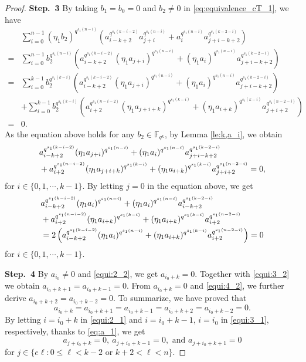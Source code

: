 \documentclass{amsart}
\theoremstyle{plain}
\theoremstyle{definition}
\newcommand{\fqk}{\mathbb{F}_{q^k}}
\begin{document}
\begin{proof}
		\textbf{Step.\ 3} By taking $b_1=b_0=0$ and $b_2\neq 0$ in \eqref{eq:equivalence_cT_1}, we have
		\begin{align*}
			&\sum_{i=0}^{n-1}(\eta_1 b_2)^{q^{s_1(n - i)}}(a_{i-k+2}^{q^{s_1(k-i-2)}} a_{j + i}^{q^{s_1(n - i)}} +a_i^{q^{s_1(n - i)}} a_{j + i - k+2}^{q^{s_1(k-2 - i)}})\\
			=&\sum_{i=0}^{n-1}b_2^{q^{s_1(n - i)}}(a_{i-k+2}^{q^{s_1(k-i-2)}} (\eta_1a_{j + i})^{q^{s_1(n - i)}} +(\eta_1a_i)^{q^{s_1(n - i)}} a_{j + i - k+2}^{q^{s_1(k-2 - i)}})\\
			=&\sum_{i=0}^{k-1}b_2^{q^{s_1(k - i)}}(a_{i-k+2}^{q^{s_1(k-i-2)}} (\eta_1a_{j + i})^{q^{s_1(n - i)}} +(\eta_1a_i)^{q^{s_1(n - i)}} a_{j + i - k+2}^{q^{s_1(k-2 - i)}})\\
			&+\sum_{i=0}^{k-1}b_2^{q^{s_1(k - i)}}(a_{i+2}^{q^{s_1(n-i-2)}} (\eta_1a_{j + i+k})^{q^{s_1(k - i)}} +(\eta_1a_{i+k})^{q^{s_1(k - i)}} a_{j + i+2}^{q^{s_1(n-2 - i)}})\\
			=&0.
		\end{align*}
		As the equation  above holds for any $b_2\in\fqk$,  by Lemma \ref{le:k,a_i}, we obtain
		\begin{align}\label{equi:4_1}
			\notag&	a_{i-k+2}^{q^{s_1(k-i-2)}} (\eta_1a_{j + i})^{q^{s_1(n - i)}} +(\eta_1a_i)^{q^{s_1(n - i)}} a_{j + i - k+2}^{q^{s_1(k-2 - i)}}\\&+a_{i+2}^{q^{s_1(n-i-2)}} (\eta_1a_{j + i+k})^{q^{s_1(k - i)}} +(\eta_1a_{i+k})^{q^{s_1(k - i)}} a_{j + i+2}^{q^{s_1(n-2 - i)}}=0,
		\end{align}
		for $i\in\{0,1,\cdots, k-1\}$.
		By letting $j=0$ in the equation above, we get 
		\begin{align}\label{equi:4_2}
			\notag&	a_{i-k+2}^{q^{s_1(k-i-2)}} (\eta_1a_{ i})^{q^{s_1(n - i)}} +(\eta_1a_i)^{q^{s_1(n - i)}} a_{ i - k+2}^{q^{s_1(k-2 - i)}}\\
			\notag&+a_{i+2}^{q^{s_1(n-i-2)}} (\eta_1a_{ i+k})^{q^{s_1(k - i)}} +(\eta_1a_{i+k})^{q^{s_1(k - i)}} a_{i+2}^{q^{s_1(n-2 - i)}}\\
			&=2\left(	a_{i-k+2}^{q^{s_1(k-i-2)}} (\eta_1a_{ i})^{q^{s_1(n - i)}}+(\eta_1a_{i+k})^{q^{s_1(k - i)}} a_{i+2}^{q^{s_1(n-2 - i)}}\right)=0
		\end{align}
		for $i\in\{0,1,\cdots, k-1\}$.
		
		\textbf{Step.\ 4}	
		By $a_{i_0}\neq0$ and \eqref{equi:2_2}, we get
		$a_{i_0+k}=0$. Together with \eqref{equi:3_2} we obtain $a_{i_0+k+1}=a_{i_0+k-1}=0$. From $a_{i_0+k}=0$ and \eqref{equi:4_2}, we further derive $a_{i_0+k+2}=a_{i_0+k-2}=0$. To summarize, we have proved that
		\begin{equation}\label{eq:a_1}
			a_{i_0+k}=a_{i_0+k+1}=a_{i_0+k-1}=a_{i_0+k+2}=a_{i_0+k-2}=0.
		\end{equation}
		By letting $i = i_0+k$ in \eqref{equi:2_1} and $i = i_0+k-1$, $i=i_0$ in \eqref{equi:3_1}, respectively,  thanks to \eqref{eq:a_1}, we get
		\begin{equation*}
			a_{j+i_0+k}=0,~a_{j +i_0+k-1}=0,  \text{ and } a_{j +i_0+k+1}=0
		\end{equation*}
		for  $j\in\{e\ell: 0\leq \ell < k-2\text{ or  }k+2< \ell <n\}$.
		

\end{proof}
\end{document}
